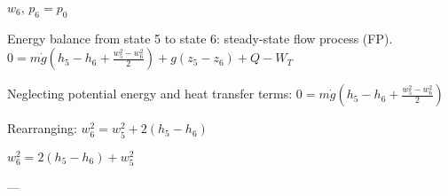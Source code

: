 \( w_6 \), \( p_6 = p_0 \)  

Energy balance from state 5 to state 6: steady-state flow process (FP).  
\( 0 = m \dot{g} \left( h_5 - h_6 + \frac{w_5^2 - w_6^2}{2} \right) + g(z_5 - z_6) + Q - W_T \)  

Neglecting potential energy and heat transfer terms:  
\( 0 = m \dot{g} \left( h_5 - h_6 + \frac{w_5^2 - w_6^2}{2} \right) \)  

Rearranging:  
\( w_6^2 = w_5^2 + 2(h_5 - h_6) \)  

\( w_6^2 = 2(h_5 - h_6) + w_5^2 \)  

---